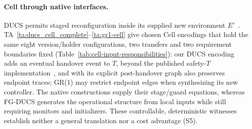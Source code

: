 \paragraph{Cell through native interfaces.}
DUCS permits staged reconfiguration inside its supplied new environment $E'$~\cite[Sec.~4.2]{Nahabedian2020}. TA~\ref{ta:ducs_cell_complete}--\ref{ta:gr1-cell} give chosen Cell encodings that hold the same eight version/holder configurations, two transfers and two requirement boundaries fixed (Table~\ref{tab:cell-input-responsibilities}): our DUCS encoding adds an eventual handover event to $T$, beyond the published safety-$T$ implementation~\cite[Sec.~5.3]{Nahabedian2020}, and with its explicit post-handover graph also preserves endpoint traces; GR(1) may restrict endpoint edges when synthesizing its new controller. The native constructions supply their stage/guard equations, whereas FG-DUCS generates the operational structure from local inputs while still requiring monitors and initializers. These controllable, deterministic witnesses establish neither a general translation nor a cost advantage (S5).
